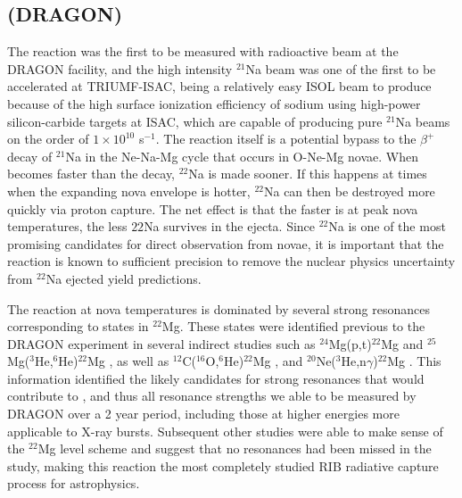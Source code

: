 \subsection{ (DRAGON)}
The  reaction was the first to be measured with radioactive beam at the DRAGON facility, and the high intensity $^{21}$Na beam was one of the first to be accelerated at TRIUMF-ISAC, being a relatively easy ISOL beam to produce because of the high surface ionization efficiency of sodium using high-power silicon-carbide targets at ISAC, which are capable of producing pure $^{21}$Na beams on the order of $1 \times 10^{10}$ s$^{-1}$. 
The  reaction itself is a potential bypass to the $\beta^{+}$ decay of $^{21}$Na in the Ne-Na-Mg cycle that occurs in O-Ne-Mg novae. When  becomes faster than the decay, $^{22}$Na is made sooner. If this happens at times when the expanding nova envelope is hotter, $^{22}$Na can then be destroyed more quickly via proton capture. The net effect is that the faster  is at peak nova temperatures, the less ${22}$Na survives in the ejecta. Since $^{22}$Na is one of the most promising candidates for direct observation from novae, it is important that the  reaction is known to sufficient precision to remove the nuclear physics uncertainty from $^{22}$Na ejected yield predictions.  

The  reaction at nova temperatures is dominated by several strong resonances corresponding to states in $^{22}$Mg. These states were identified previous to the DRAGON experiment in several indirect studies such as $^{24}$Mg(p,t)$^{22}$Mg \cite{bat01,mic02} and $^{25}$Mg($^{3}$He,$^{6}$He)$^{22}$Mg \cite{cag02}, as well as $^{12}$C($^{16}$O,$^{6}$He)$^{22}$Mg \cite{che01}, and $^{20}$Ne($^{3}$He,n$\gamma$)$^{22}$Mg \cite{rol72}. 
This information identified the likely candidates for strong resonances that would contribute to , and thus all resonance strengths we able to be measured by DRAGON over a 2 year period, including those at higher energies more applicable to X-ray bursts. Subsequent other studies \cite{rui05,sew05} were able to make sense of the $^{22}$Mg level scheme and suggest that no resonances had been missed in the study, making this reaction the most completely studied RIB radiative capture process for astrophysics.  

